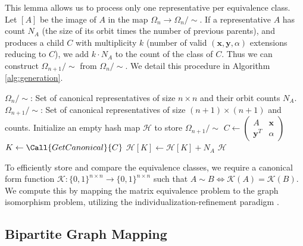 \documentclass[reqno]{amsart}
\numberwithin{equation}{section}
\begin{document}
This lemma allows us to process only one representative per equivalence class. Let $[A]$ be the image of $A$ in the map $\Omega_n \to \Omega_n / \sim$. If a representative $A$ has count $N_A$ (the size of its orbit times the number of previous parents), and produces a child $C$ with multiplicity $k$ (number of valid $(\mathbf{x}, \mathbf{y}, \alpha)$ extensions reducing to $C$), we add $k \cdot N_A$ to the count of the class of $C$. Thus we can construct $\Omega_{n+1} / \sim$ from $\Omega_n / \sim$. We detail this procedure in Algorithm \ref{alg:generation}.


\begin{algorithm}[t]
\caption{Generation of Strongly Non-Singular Representatives of Dimension $n+1$}
\label{alg:generation}
\begin{algorithmic}[1]
\Require $\Omega_n/\sim$: Set of canonical representatives of size $n \times n$ and their orbit counts $N_A$.
\Ensure $\Omega_{n+1}/\sim$: Set of canonical representatives of size $(n+1) \times (n+1)$ and counts.
\State Initialize an empty hash map $\mathcal{H}$ to store $\Omega_{n+1}/\sim$
        \State $C \gets \begin{pmatrix} A & \mathbf{x} \\ \mathbf{y}^T & \alpha \end{pmatrix}$
         
            \State $K \gets \Call{GetCanonical}{C}$
            \State $\mathcal{H}[K] \gets \mathcal{H}[K] + N_A$ 
        \EndIf
    \EndFor
\EndFor
\State \Return $\mathcal{H}$
\end{algorithmic}
\end{algorithm}

To efficiently store and compare the equivalence classes, we require a canonical form function $\mathcal{K}: \{0,1\}^{n \times n} \to \{0,1\}^{n \times n}$ such that $A \sim B \iff \mathcal{K}(A) = \mathcal{K}(B)$. We compute this by mapping the matrix equivalence problem to the graph isomorphism problem, utilizing the individualization-refinement paradigm \cite{McKay1981, McKay2014}.



\subsection{Bipartite Graph Mapping}\label{sub:bipartite}
\end{document}
